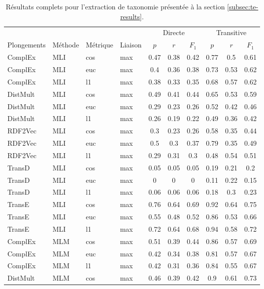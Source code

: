 \begin{longtable}{|llll|ccc|ccc|}
    \caption{Résultats complets pour l'extraction de taxonomie présentée à la section \ref{subsec:te-results}.}
    \label{tab:te-full-results}
    \hline 
	&		&		&		&	\multicolumn{3}{c|}{Directe} & \multicolumn{3}{c|}{Transitive}   \\
Plongements	&	Méthode	&	Métrique	&	Liaison	&	$p$	&	$r$	&	$F_1$	&	$p$	&	$r$	&	$F_1$	\\
\hline \endhead
\hline \endfoot
ComplEx	&	MLI	&	cos	&	max	&	0.47	&	0.38	&	0.42	&	0.77	&	0.5	&	0.61 \\ 
ComplEx	&	MLI	&	euc	&	max	&	0.4	&	0.36	&	0.38	&	0.73	&	0.53	&	0.62 \\ 
ComplEx	&	MLI	&	l1	&	max	&	0.38	&	0.33	&	0.35	&	0.68	&	0.57	&	0.62 \\ 
DistMult	&	MLI	&	cos	&	max	&	0.49	&	0.41	&	0.44	&	0.65	&	0.53	&	0.59 \\ 
DistMult	&	MLI	&	euc	&	max	&	0.29	&	0.23	&	0.26	&	0.52	&	0.42	&	0.46 \\ 
DistMult	&	MLI	&	l1	&	max	&	0.26	&	0.19	&	0.22	&	0.49	&	0.36	&	0.42 \\ 
RDF2Vec	&	MLI	&	cos	&	max	&	0.3	&	0.23	&	0.26	&	0.58	&	0.35	&	0.44 \\ 
RDF2Vec	&	MLI	&	euc	&	max	&	0.5	&	0.3	&	0.37	&	0.79	&	0.35	&	0.49 \\ 
RDF2Vec	&	MLI	&	l1	&	max	&	0.29	&	0.31	&	0.3	&	0.48	&	0.54	&	0.51 \\ 
TransD	&	MLI	&	cos	&	max	&	0.05	&	0.05	&	0.05	&	0.19	&	0.21	&	0.2 \\ 
TransD	&	MLI	&	euc	&	max	&	0	&	0	&	0	&	0.11	&	0.22	&	0.15 \\ 
TransD	&	MLI	&	l1	&	max	&	0.06	&	0.06	&	0.06	&	0.18	&	0.3	&	0.23 \\ 
TransE	&	MLI	&	cos	&	max	&	0.76	&	0.64	&	0.69	&	0.92	&	0.64	&	0.75 \\ 
TransE	&	MLI	&	euc	&	max	&	0.55	&	0.48	&	0.52	&	0.86	&	0.53	&	0.66 \\ 
TransE	&	MLI	&	l1	&	max	&	0.72	&	0.64	&	0.68	&	0.94	&	0.58	&	0.72 \\ 
ComplEx	&	MLM	&	cos	&	max	&	0.51	&	0.39	&	0.44	&	0.86	&	0.57	&	0.69 \\ 
ComplEx	&	MLM	&	euc	&	max	&	0.42	&	0.34	&	0.38	&	0.81	&	0.57	&	0.67 \\ 
ComplEx	&	MLM	&	l1	&	max	&	0.42	&	0.31	&	0.36	&	0.84	&	0.55	&	0.67 \\ 
DistMult	&	MLM	&	cos	&	max	&	0.46	&	0.39	&	0.42	&	0.9	&	0.61	&	0.73 \\ 

\end{longtable}
